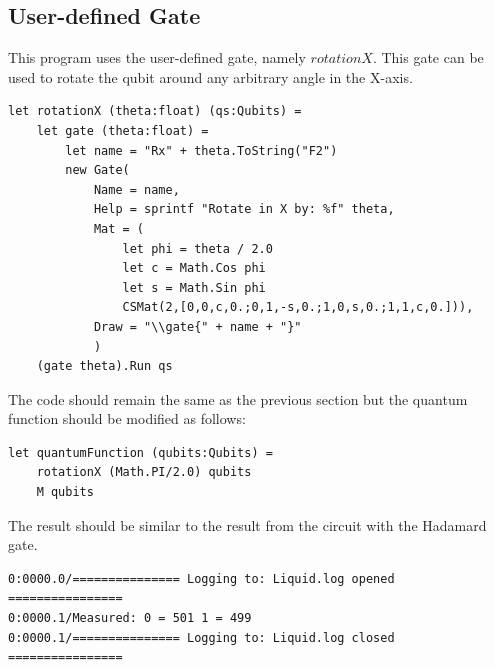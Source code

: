 \documentclass[12pt]{third-rep}
\begin{document}
\subsection{User-defined Gate}
This program uses the user-defined gate, namely $rotationX$. This gate can be used to rotate the qubit around any arbitrary angle in the X-axis.
\begin{verbatim}
let rotationX (theta:float) (qs:Qubits) =
    let gate (theta:float) =
        let name = "Rx" + theta.ToString("F2")
        new Gate(
            Name = name,
            Help = sprintf "Rotate in X by: %f" theta,
            Mat = (
                let phi = theta / 2.0
                let c = Math.Cos phi
                let s = Math.Sin phi
                CSMat(2,[0,0,c,0.;0,1,-s,0.;1,0,s,0.;1,1,c,0.])),
            Draw = "\\gate{" + name + "}"
            )
    (gate theta).Run qs
\end{verbatim}
The code should remain the same as the previous section but the quantum function should be modified as follows:
\begin{verbatim}
let quantumFunction (qubits:Qubits) =
    rotationX (Math.PI/2.0) qubits
    M qubits
\end{verbatim}
The result should be similar to the result from the circuit with the Hadamard gate.
\begin{verbatim}
0:0000.0/=============== Logging to: Liquid.log opened ================
0:0000.1/Measured: 0 = 501 1 = 499
0:0000.1/=============== Logging to: Liquid.log closed ================
\end{verbatim}
\end{document}
